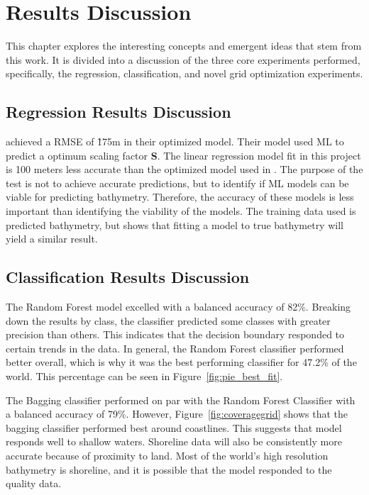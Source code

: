 \section{Results Discussion}
\setlength{\parindent}{10ex}
This chapter explores the interesting concepts and emergent ideas that stem from this work.
It is divided into a discussion of the three core experiments performed, specifically, the regression, classification, and novel grid optimization experiments.

\subsection{Regression Results Discussion}
\cite{jena2012prediction} achieved a \ac{RMSE} of \~175m in their optimized model.
Their model used \ac{ML} to predict a optimum scaling factor \textbf{S}.
The linear regression model fit in this project is 100 meters less accurate than the optimized model used in \cite{jena2012prediction}.
The purpose of the test is not to achieve accurate predictions, but to identify if \ac{ML} models can be viable for predicting bathymetry.
Therefore, the accuracy of these models is less important than identifying the viability of the models.
The training data used is predicted bathymetry, but shows that fitting a model to true bathymetry will yield a similar result.

\subsection{Classification Results Discussion}
The Random Forest model excelled with a balanced accuracy of 82\%.
Breaking down the results by class, the classifier predicted some classes with greater precision than others.
This indicates that the decision boundary responded to certain trends in the data.
In general, the Random Forest classifier performed better overall, which is why it was the best performing classifier for 47.2\% of the world.
This percentage can be seen in Figure~\ref{fig:pie_best_fit}.

\par
The Bagging classifier performed on par with the Random Forest Classifier with a balanced accuracy of 79\%.
However, Figure~\ref{fig:coveragegrid} shows that the bagging classifier performed best around coastlines.
This suggests that model responds well to shallow waters.
Shoreline data will also be consistently more accurate because of proximity to land.
Most of the world's high resolution bathymetry is shoreline, and it is possible that the model responded to the quality data.


